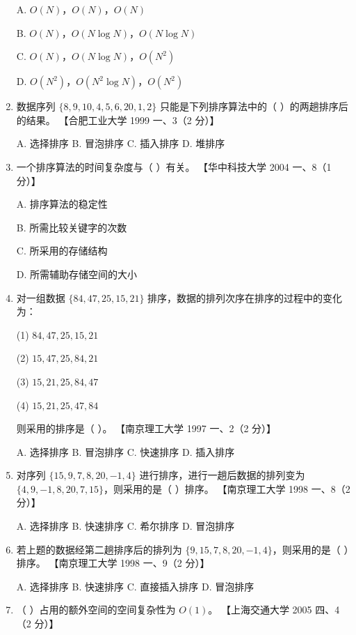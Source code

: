 \documentclass[lang=cn,newtx,10pt,scheme=chinese]{../../elegantbook}
\begin{document}
\begin{enumerate}
    A. $O(N)$，$O(N)$，$O(N)$  

    B. $O(N)$，$O(N \log N)$，$O(N \log N)$  

    C. $O(N)$，$O(N \log N)$，$O(N^2)$

    D. $O(N^2)$，$O(N^2 \log N)$，$O(N^2)$  

    \item 数据序列 $\{8, 9, 10, 4, 5, 6, 20, 1, 2\}$ 只能是下列排序算法中的（ ）的两趟排序后的结果。  
    【合肥工业大学 1999 一、3（2 分）】  

    A. 选择排序 \quad B. 冒泡排序 \quad C. 插入排序 \quad D. 堆排序  

    \item 一个排序算法的时间复杂度与（ ）有关。  
    【华中科技大学 2004 一、8（1 分）】  

    A. 排序算法的稳定性  

    B. 所需比较关键字的次数  

    C. 所采用的存储结构  
    
    D. 所需辅助存储空间的大小  

    \item 对一组数据 $\{84, 47, 25, 15, 21\}$ 排序，数据的排列次序在排序的过程中的变化为：  
    
    (1) $84, 47, 25, 15, 21$  
   
    (2) $15, 47, 25, 84, 21$  
   
    (3) $15, 21, 25, 84, 47$  
    
    (4) $15, 21, 25, 47, 84$  

    则采用的排序是（ ）。  
    【南京理工大学 1997 一、2（2 分）】  

    A. 选择排序 \quad B. 冒泡排序 \quad C. 快速排序 \quad D. 插入排序  

    \item 对序列 $\{15, 9, 7, 8, 20, -1, 4\}$ 进行排序，进行一趟后数据的排列变为 $\{4, 9, -1, 8, 20, 7, 15\}$，则采用的是（ ）排序。  
    【南京理工大学 1998 一、8（2 分）】  

    A. 选择排序 \quad B. 快速排序 \quad C. 希尔排序 \quad D. 冒泡排序  

    \item 若上题的数据经第二趟排序后的排列为 $\{9, 15, 7, 8, 20, -1, 4\}$，则采用的是（ ）排序。  
    【南京理工大学 1998 一、9（2 分）】 

    A. 选择排序 \quad B. 快速排序 \quad C. 直接插入排序 \quad D. 冒泡排序  

    \item （ ）占用的额外空间的空间复杂性为 $O(1)$。  
    【上海交通大学 2005 四、4（2 分）】  


\end{enumerate}
\end{document}
